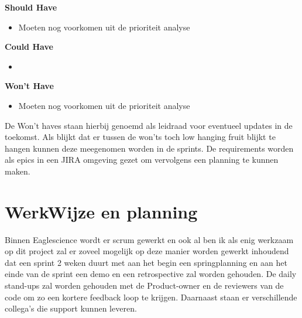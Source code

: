 \textbf{Should Have}
\begin{itemize}
  \item Moeten nog voorkomen uit de prioriteit analyse
\end{itemize}

\textbf{Could Have}
\begin{itemize}
\item
\end{itemize}

\textbf{Won't Have}
\begin{itemize}
  \item Moeten nog voorkomen uit de prioriteit analyse
\end{itemize}
De Won't haves staan hierbij genoemd als leidraad voor eventueel updates in de toekomst. Als blijkt dat er tussen de won'ts toch low hanging fruit blijkt te hangen kunnen deze meegenomen worden in de sprints. De requirements worden als epics in een JIRA omgeving gezet om vervolgens een planning te kunnen maken.


\section{WerkWijze en planning}
Binnen Eaglescience wordt er scrum gewerkt en ook al ben ik als enig werkzaam op dit project zal er zoveel mogelijk op deze manier worden gewerkt inhoudend dat een sprint 2 weken duurt met aan het begin een springplanning en aan het einde van de sprint een demo en een retrospective zal worden gehouden. De daily stand-ups zal worden gehouden met de Product-owner en de reviewers van de code om zo een kortere feedback loop te krijgen. Daarnaast staan er verschillende collega's die support kunnen leveren.
